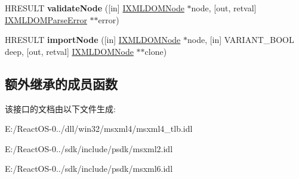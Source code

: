 \begin{DoxyCompactItemize}
H\+R\+E\+S\+U\+LT {\bfseries validate\+Node} (\mbox{[}in\mbox{]} \hyperlink{interface_m_s_x_m_l2_1_1_i_x_m_l_d_o_m_node}{I\+X\+M\+L\+D\+O\+M\+Node} $\ast$node, \mbox{[}out, retval\mbox{]} \hyperlink{interface_m_s_x_m_l2_1_1_i_x_m_l_d_o_m_parse_error}{I\+X\+M\+L\+D\+O\+M\+Parse\+Error} $\ast$$\ast$error)
\item 
\mbox{\label{interface_m_s_x_m_l2_1_1_i_x_m_l_d_o_m_document3_a3ab8ed71a9a39481ebec1a4fa168a0cf}} 
H\+R\+E\+S\+U\+LT {\bfseries import\+Node} (\mbox{[}in\mbox{]} \hyperlink{interface_m_s_x_m_l2_1_1_i_x_m_l_d_o_m_node}{I\+X\+M\+L\+D\+O\+M\+Node} $\ast$node, \mbox{[}in\mbox{]} V\+A\+R\+I\+A\+N\+T\+\_\+\+B\+O\+OL deep, \mbox{[}out, retval\mbox{]} \hyperlink{interface_m_s_x_m_l2_1_1_i_x_m_l_d_o_m_node}{I\+X\+M\+L\+D\+O\+M\+Node} $\ast$$\ast$clone)
\end{DoxyCompactItemize}
\subsection*{额外继承的成员函数}


该接口的文档由以下文件生成\+:\begin{DoxyCompactItemize}
\item 
E\+:/\+React\+O\+S-\/0../dll/win32/msxml4/msxml4\+\_\+tlb.\+idl\item 
E\+:/\+React\+O\+S-\/0../sdk/include/psdk/msxml2.\+idl\item 
E\+:/\+React\+O\+S-\/0../sdk/include/psdk/msxml6.\+idl\end{DoxyCompactItemize}
